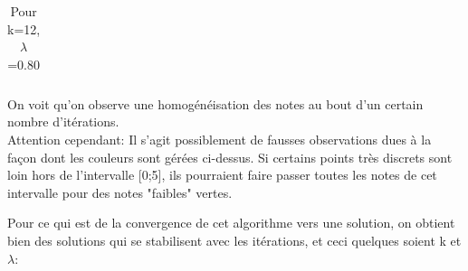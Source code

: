 \documentclass[12pt,a4paper]{article}
\begin{document}
\begin{table}[h]
\begin{tabular}{cccc}
\end{tabular}
\caption{Pour k=12, $\lambda$=0.80}
\end{table}

On voit qu'on observe une homogénéisation des notes au bout d'un certain nombre d'itérations.\\
Attention cependant: Il s'agit possiblement de fausses observations dues à la façon dont les couleurs sont gérées ci-dessus. 
Si certains points très discrets sont loin hors de l'intervalle [0;5], ils pourraient faire passer toutes les notes de cet intervalle pour des notes "faibles" vertes.\\

\newpage

Pour ce qui est de la convergence de cet algorithme vers une solution, on obtient bien des solutions qui se stabilisent avec les itérations, et ceci quelques soient k et $\lambda$:
\end{document}
